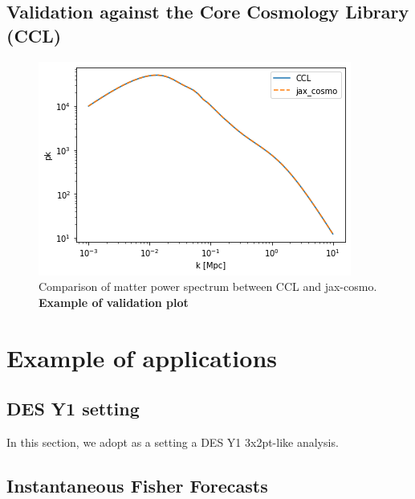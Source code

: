 \documentclass[final,5p,times,twocolumn,authoryear]{elsarticle}
\begin{document}
\subsection{Validation against the Core Cosmology Library (CCL)} 

\begin{figure}[h]
    \centering
    \includegraphics[width=\columnwidth]{figures/halofit_pk.png}
    \caption{Comparison of matter power spectrum between CCL and jax-cosmo. \textbf{Example of validation plot} \href{https://github.com/DifferentiableUniverseInitiative/jax_cosmo/blob/master/docs/notebooks/CCL_comparison.ipynb}{\faFileCodeO}}
    \label{fig:halofit_comparison}
\end{figure}



\section{Example of applications}

\subsection{DES Y1 setting}
 
In this section, we adopt as a setting a DES Y1 3x2pt-like analysis. 


\subsection{Instantaneous Fisher Forecasts}
\end{document}
